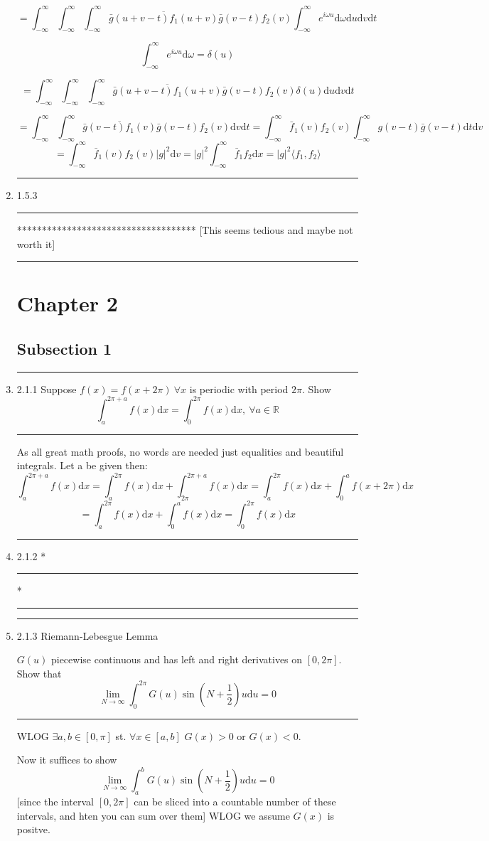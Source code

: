 \documentclass[12pt]{article}
\newcommand{\RR}{\mathbb{R}}
\newcommand{\rw}{\rightarrow}
\newcommand{\di}{\mathrm{d}}
\newcommand{\intinf}{\int_{-\infty}^\infty}
\theoremstyle{definition}
\begin{document}
\begin{enumerate}
\[
=
\intinf \intinf 
\intinf  
\overline{
\bar g(u+v-t)  f_1(u+v) 
}
\bar g(v-t)  f_2(v) 
\intinf
e^{i\omega u}
\di \omega 
\di u \di v
\di t
\]

\[
\intinf
e^{i\omega u}
\di \omega 
= \delta( u)
\]

\[
=
\intinf \intinf 
\intinf  
\overline{
\bar g(u+v-t)  f_1(u+v) 
}
\bar g(v-t)  f_2(v) 
\delta(u)
\di u \di v
\di t
\]

\[
=
\intinf \intinf 
\overline{
\bar g(v-t)  f_1(v) 
}
\bar g(v-t)  f_2(v) 
 \di v
\di t
=
\intinf 
\bar  f_1(v)  f_2(v) 
 \intinf g(v-t)\bar g(v-t) 
\di t
 \di v
\]
\[
=
\intinf 
\bar  f_1(v)  f_2(v) 
|g|^2
 \di v
=
|g|^2
\intinf \bar f_1 f_2 \di x
= |g|^2 \langle f_1, f_2 \rangle
\]

\hrule
\item 1.5.3
\hrule
    
    ************************************
    [This seems tedious and maybe not worth it]

\hrule

\section{Chapter 2}
\subsection{Subsection 1}
\hrule
\item 2.1.1
Suppose $f(x) =f(x+2\pi) \ \forall x$ is periodic with period $2\pi$.
Show 
\[
\int_a^{2\pi +a} f(x) \di x
=
\int_0^{2\pi} f(x) \di x
, \ \forall a \in \RR
\]
\hrule
As all great math proofs, no words are needed just equalities and beautiful integrals.
Let a be given then:
\[
\int_a^{2\pi +a} f(x) \di x
=
\int_a^{2\pi} f(x) \di x +
\int_{2\pi}^{2\pi +a} f(x) \di x
=
\int_a^{2\pi} f(x) \di x +
\int_{0}^{a} f(x+2\pi) \di x
\]
\[
=
\int_a^{2\pi} f(x) \di x +
\int_{0}^{a} f(x) \di x
=
\int_0^{2\pi} f(x) \di x
\]

\hrule
\item 2.1.2
*
\hrule
*
\hrule


\hrule
\item 2.1.3
Riemann-Lebesgue Lemma

$G(u)$ piecewise continuous and has left and right derivatives on $[0,2\pi]$. Show that 
\[
\lim_{N \rw \infty} \int_0^{2\pi} G(u) \sin ( N +\frac 1 2)u \di u=0
\]
\hrule
WLOG $\exists a,b \in [0,\pi]$ st. $\forall x \in [a,b]$ $G(x) >0$ or $G(x) <0$.

Now it suffices to show 
\[
\lim_{N \rw \infty} \int_a^{b} G(u) \sin ( N +\frac 1 2)u \di u =0
\]
[since the interval $[0,2\pi]$ can be sliced into a countable number of these intervals, and hten you can sum over them]
WLOG we assume $G(x)$ is positve.


\end{enumerate}
\end{document}
